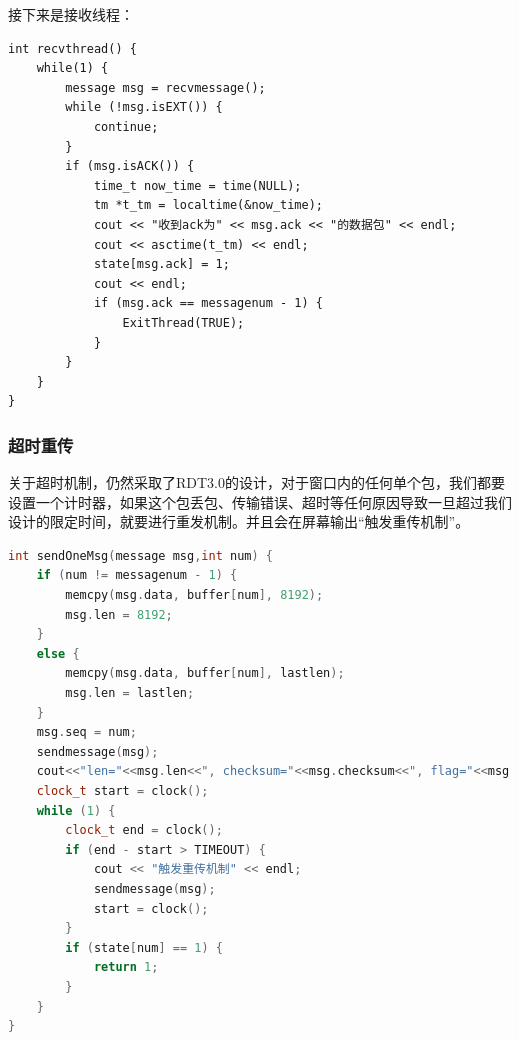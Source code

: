 \documentclass[UTF8,a4paper,10pt]{ctexart}
\begin{document}
接下来是接收线程：
\begin{lstlisting}
int recvthread() {
    while(1) {
        message msg = recvmessage();
        while (!msg.isEXT()) {
            continue;
        }
        if (msg.isACK()) {
            time_t now_time = time(NULL);
            tm *t_tm = localtime(&now_time);
            cout << "收到ack为" << msg.ack << "的数据包" << endl;
            cout << asctime(t_tm) << endl;
            state[msg.ack] = 1;
            cout << endl;
            if (msg.ack == messagenum - 1) {
                ExitThread(TRUE);
            }
        }
    }
}
\end{lstlisting}
\subsubsection{超时重传}
关于超时机制，仍然采取了RDT3.0的设计，对于窗口内的任何单个包，我们都要设置一个计时器，如果这个包丢包、传输错误、超时等任何原因导致一旦超过我们设计的限定时间，就要进行重发机制。并且会在屏幕输出“触发重传机制”。
\begin{lstlisting}[title=超时重传,frame=trbl,language={C++}]
int sendOneMsg(message msg,int num) {
    if (num != messagenum - 1) {
        memcpy(msg.data, buffer[num], 8192);
        msg.len = 8192;
    }
    else {
        memcpy(msg.data, buffer[num], lastlen);
        msg.len = lastlen;
    }
    msg.seq = num;
    sendmessage(msg);
    cout<<"len="<<msg.len<<", checksum="<<msg.checksum<<", flag="<<msg.flag<<", seq="<<msg.seq<<endl;
    clock_t start = clock();
    while (1) {
        clock_t end = clock();
        if (end - start > TIMEOUT) {
            cout << "触发重传机制" << endl;
            sendmessage(msg);
            start = clock();
        }
        if (state[num] == 1) {
            return 1;
        }
    }
}
\end{lstlisting}
\end{document}
